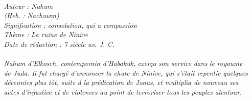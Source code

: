 \BFont
\noindent\hrulefill
{\footnotesize
\textit{
\bigskip
{\centering{}
\\Auteur : Nahum
\\(Heb. : Nachuwm)
\\Signification : consolation, qui a compassion
\\Thème : La ruine de Ninive
\\Date de rédaction : 7 siècle av. J.-C.\\}
}
\textit{
\\Nahum d'Elkosch, contemporain d'Habakuk, exerça son service dans le royaume de Juda. Il fut chargé d'annoncer la chute de Ninive, qui s'était repentie quelques décennies plus tôt, suite à la prédication de Jonas, et multiplia de nouveau ses actes d'injustice et de violences au point de terroriser tous les peuples alentour.\bigskip
}
}
\par\nobreak\noindent\hrulefill

